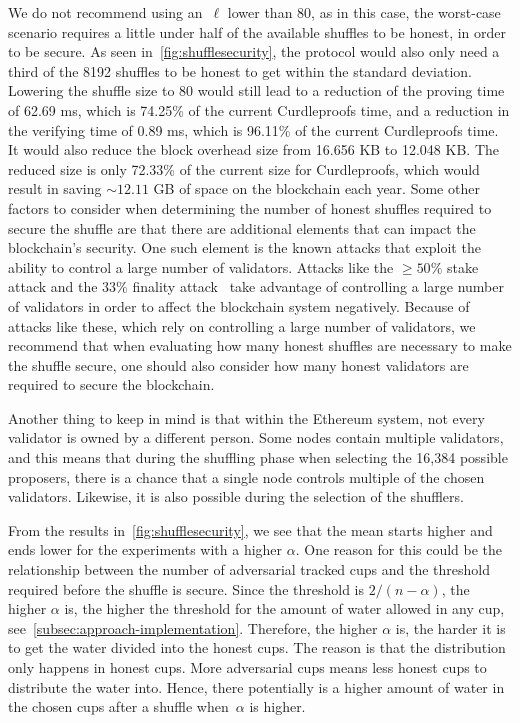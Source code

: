 We do not recommend using an~$\ell$ lower than 80, as in this case, the worst-case scenario requires a little under half of the available shuffles to be honest, in order to be secure.
As seen in~\autoref{fig:shufflesecurity}, the protocol would also only need a third of the 8192 shuffles to be honest to get within the standard deviation.
Lowering the shuffle size to 80 would still lead to a reduction of the proving time of 62.69 ms, which is 74.25\% of the current Curdleproofs time, and a reduction in the verifying time of 0.89 ms, which is 96.11\% of the current Curdleproofs time.
It would also reduce the block overhead size from 16.656 KB to 12.048 KB\@.
The reduced size is only 72.33\% of the current size for Curdleproofs, which would result in saving $\sim12.11$ GB of space on the blockchain each year.
Some other factors to consider when determining the number of honest shuffles required to secure the shuffle are that there are additional elements that can impact the blockchain's security.
One such element is the known attacks that exploit the ability to control a large number of validators.
Attacks like the $\geq50\%$ stake attack and the $33\%$ finality attack~\cite{EthereumAttackDefense2024} take advantage of controlling a large number of validators in order to affect the blockchain system negatively.
Because of attacks like these, which rely on controlling a large number of validators, we recommend that when evaluating how many honest shuffles are necessary to make the shuffle secure, one should also consider how many honest validators are required to secure the blockchain.

Another thing to keep in mind is that within the Ethereum system, not every validator is owned by a different person.
Some nodes contain multiple validators, and this means that during the shuffling phase when selecting the 16,384 possible proposers, there is a chance that a single node controls multiple of the chosen validators.
Likewise, it is also possible during the selection of the shufflers.

From the results in~\autoref{fig:shufflesecurity}, we see that the mean starts higher and ends lower for the experiments with a higher $\alpha$.
One reason for this could be the relationship between the number of adversarial tracked cups and the threshold required before the shuffle is secure.
Since the threshold is $2/(n-\alpha)$, the higher $\alpha$ is, the higher the threshold for the amount of water allowed in any cup, see~\autoref{subsec:approach-implementation}.
Therefore, the higher $\alpha$ is, the harder it is to get the water divided into the honest cups.
The reason is that the distribution only happens in honest cups.
More adversarial cups means less honest cups to distribute the water into.
Hence, there potentially is a higher amount of water in the chosen cups after a shuffle when~$\alpha$ is higher.
